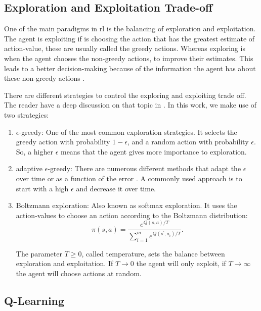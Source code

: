 \subsection{Exploration and Exploitation Trade-off}

One of the main paradigms in \gls{rl} is the balancing of exploration and exploitation.
%
The agent is exploiting if is choosing the action that has the greatest estimate of action-value, these are usually called the greedy actions.
%
Whereas exploring is when the agent chooses the non-greedy actions, to improve their estimates.
%
This leads to a better decision-making because of the information the agent has about these non-greedy actions \cite{sutton2018rl}.
%


There are different strategies to control the exploring and exploiting trade off. The reader have a deep discussion on that topic in \cite{exploration2016}.
%
In this work, we make use of two strategies:
\begin{enumerate}
  \item $\epsilon$-greedy: One of the most common exploration strategies. It selects the greedy action with probability $1-\epsilon$, and a random action with probability $\epsilon$. So, a higher $\epsilon$ means that the agent gives more importance to exploration.
  \item adaptive $\epsilon$-greedy: There are numerous different methods that adapt the $\epsilon$ over time or as a function of the error \cite{improvingBandits}. A commonly used approach is to start with a high $\epsilon$ and decrease it over time.
  \item Boltzmann exploration: Also known as softmax exploration. It uses the action-values to choose an action according to the Boltzmann distribution:
  \begin{equation}
      \pi\left(s, a\right)=\frac{e^{Q\left(s, a\right) / T}}{\sum_{i=1}^{m} e^{Q\left(s^{\prime}, a_i\right) / T}} \text{.}
  \end{equation}

  The parameter $T \geq 0$, called temperature, sets the balance between exploration and exploitation. If $T \rightarrow 0$  the agent will only exploit, if $T \rightarrow \infty$ the agent will choose actions at random.
\end{enumerate}


\subsection{Q-Learning}

